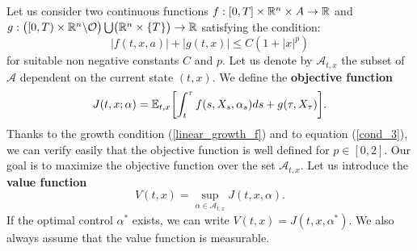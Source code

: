 \noindent
Let us consider two continuous functions $f:[0,T]\times \mathbb{R}^n \times A \to \mathbb{R}$ and $g: \bigl( [0,T)\times \mathbb{R}^n \backslash \mathcal{O} \bigr) \bigcup \bigl( \mathbb{R}^n \times \{T\} \bigr) \to \mathbb{R}$ 
satisfying the condition:
 \begin{equation}\label{linear_growth_f}
  |f(t,x,a)| + |g(t,x)| \leq C (1+|x|^p)
 \end{equation}
for suitable non negative constants $C$ and $p$.
Let us denote by $\mathcal{A}_{t,x}$ the subset of $\mathcal{A}$ dependent on the current state $(t,x)$. %
We define the \textbf{objective function}
\begin{equation}\label{cost_functional}
 J(t,x;\alpha) = \mathbb{E}_{t,x} \biggl[ \int_t^{\tau} f(s,X_s,\alpha_s) ds + g(\tau, X_{\tau}) \biggr].
\end{equation}
Thanks to the growth condition (\ref{linear_growth_f}) and to equation (\ref{cond_3}), we can verify easily that the objective function is well defined for $p\in [0,2]$. 
Our goal is to maximize the objective function over the set $\mathcal{A}_{t,x}$. Let us introduce the \textbf{value function}
\begin{equation}\label{general_value_function}
 V(t,x) = \sup_{\alpha \in \mathcal{A}_{t,x}} J(t,x,\alpha).
\end{equation}
If the optimal control $\alpha^*$ exists, we can write $V(t,x) = J(t,x, \alpha^*)$.
We also always assume that the value function is 
measurable.
\newline

